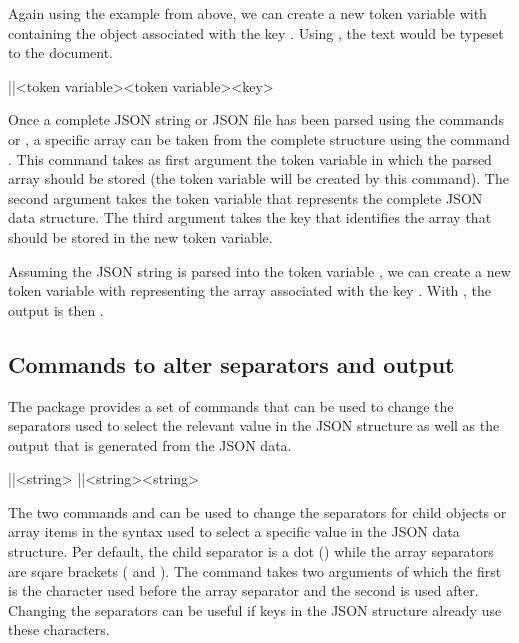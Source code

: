 \documentclass[a4paper]{article}
\begin{document}
Again using the example from above, we can create a new token variable \macro{\myJSONobject} with  containing the object associated with the key . Using , the text  would be typeset to the document.

\begin{macrodef}
|\JSONParseArray|{<token variable>}{<token variable>}{<key>}
\end{macrodef}
Once a complete JSON string or JSON file has been parsed using the commands \macro{\JSONParse} or \macro{\JSONParseFromFile}, a specific array can be taken from the complete structure using the command \macro{\JSONParseArray}. This command takes as first argument the token variable in which the parsed array should be stored (the token variable will be created by this command). The second argument takes the token variable that represents the complete JSON data structure. The third argument takes the key that identifies the array that should be stored in the new token variable.

Assuming the JSON string  is parsed into the token variable \macro{\myJSONdata}, we can create a new token variable \macro{\myJSONarray} with  representing the array associated with the key . With \macro{\JSONParseGetValue{\myJSONarray}{[0]}}, the output is then .


\subsection{Commands to alter separators and output}

The package provides a set of commands that can be used to change the separators used to select the relevant value in the JSON structure as well as the output that is generated from the JSON data.

\begin{macrodef}
|\JSONParseSetChildSeparator|{<string>}
|\JSONParseSetArraySeparator|{<string>}{<string>}
\end{macrodef}
The two commands \macro{\JSONParseSetChildSeparator} and \macro{\JSONParseSetArraySeparator} can be used to change the separators for child objects or array items in the syntax used to select a specific value in the JSON data structure. Per default, the child separator is a dot () while the array separators are sqare brackets (\macro{[} and \macro{]}). The command \macro{\JSONParseSetArraySeparator} takes two arguments of which the first is the character used before the array separator and the second is used after. Changing the separators can be useful if keys in the JSON structure already use these characters.
\end{document}

